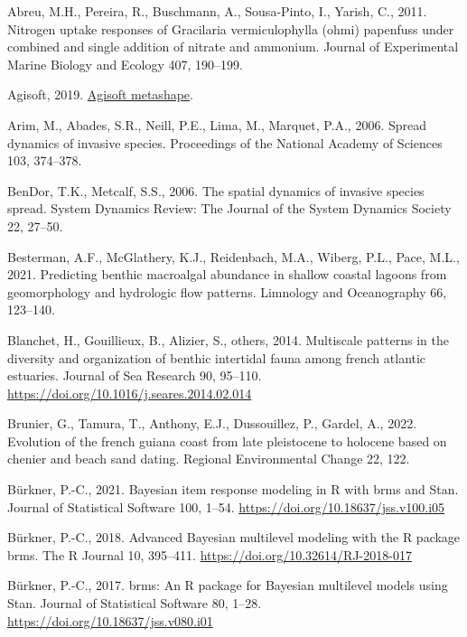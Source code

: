 \documentclass[
  letterpaper,
  DIV=11,
  numbers=noendperiod]{scrartcl}
\newlength{\cslhangindent}
\newenvironment{CSLReferences}[2] %
 {\begin{list}{}{%
  \setlength{\itemindent}{0pt}
  \setlength{\leftmargin}{0pt}
  \setlength{\parsep}{0pt}
  \ifodd #1
   \setlength{\leftmargin}{\cslhangindent}
   \setlength{\itemindent}{-1\cslhangindent}
  \fi
  \setlength{\itemsep}{#2\baselineskip}}}
 {\end{list}}
\begin{document}
\label{refs}
\begin{CSLReferences}{1}{0}
Abreu, M.H., Pereira, R., Buschmann, A., Sousa-Pinto, I., Yarish, C.,
2011. Nitrogen uptake responses of {G}racilaria vermiculophylla (ohmi)
papenfuss under combined and single addition of nitrate and ammonium.
Journal of Experimental Marine Biology and Ecology 407, 190--199.

Agisoft, 2019. \href{https://www.agisoft.com/}{Agisoft metashape}.

Arim, M., Abades, S.R., Neill, P.E., Lima, M., Marquet, P.A., 2006.
Spread dynamics of invasive species. Proceedings of the National Academy
of Sciences 103, 374--378.

BenDor, T.K., Metcalf, S.S., 2006. The spatial dynamics of invasive
species spread. System Dynamics Review: The Journal of the System
Dynamics Society 22, 27--50.

Besterman, A.F., McGlathery, K.J., Reidenbach, M.A., Wiberg, P.L., Pace,
M.L., 2021. Predicting benthic macroalgal abundance in shallow coastal
lagoons from geomorphology and hydrologic flow patterns. Limnology and
Oceanography 66, 123--140.

Blanchet, H., Gouillieux, B., Alizier, S., others, 2014. Multiscale
patterns in the diversity and organization of benthic intertidal fauna
among french atlantic estuaries. Journal of Sea Research 90, 95--110.
\url{https://doi.org/10.1016/j.seares.2014.02.014}

Brunier, G., Tamura, T., Anthony, E.J., Dussouillez, P., Gardel, A.,
2022. Evolution of the french guiana coast from late pleistocene to
holocene based on chenier and beach sand dating. Regional Environmental
Change 22, 122.

Bürkner, P.-C., 2021. Bayesian item response modeling in {R} with {brms}
and {Stan}. Journal of Statistical Software 100, 1--54.
\url{https://doi.org/10.18637/jss.v100.i05}

Bürkner, P.-C., 2018. Advanced {Bayesian} multilevel modeling with the
{R} package {brms}. The R Journal 10, 395--411.
\url{https://doi.org/10.32614/RJ-2018-017}

Bürkner, P.-C., 2017. {brms}: An {R} package for {Bayesian} multilevel
models using {Stan}. Journal of Statistical Software 80, 1--28.
\url{https://doi.org/10.18637/jss.v080.i01}


\end{CSLReferences}
\end{document}
